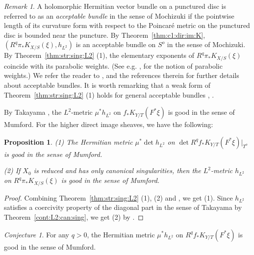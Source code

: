 \documentclass[amscd, leqno]{amsart}
\theoremstyle{plain}
\newtheorem{proposition}[theorem]{Proposition}
\theoremstyle{definition}
\theoremstyle{remark}
\newtheorem{remark}[theorem]{Remark}
\newtheorem{conjecture}[theorem]{Conjecture}
\newenvironment{pf}{\begin{proof}}{\end{proof}}
\begin{document}
\begin{remark}
A holomorphic Hermitian vector bundle on a punctured disc is referred to as an {\em acceptable bundle} in the sense of Mochizuki
\cite[Sect.\,21]{Mochizuki11} if the pointwise length of its curvature form with respect to the Poincar\'e metric on the punctured disc 
is bounded near the puncture. By Theorem~\ref{thm:c1:dir:im:K}, $(R^{q}\pi_{*}K_{X/S}(\xi),h_{L^{2}})$ is an acceptable bundle 
on $S^{o}$ in the sense of Mochizuki. By Theorem~\ref{thm:str:sing:L2} (1), the elementary exponents of $R^{q}\pi_{*}K_{X/S}(\xi)$
coincide with its parabolic weights. 
(See e.g. \cite[Sect.\,21.4.1]{Mochizuki11}, \cite[7.11]{FujinoFujisawaOno25} for the notion of parabolic weights.)
We refer the reader to \cite[Sect.\,21]{Mochizuki11}, \cite{FujinoFujisawaOno25} 
and the references therein for further details about acceptable bundles. 
It is worth remarking that a weak form of Theorem~\ref{thm:str:sing:L2} (1)
holds for general acceptable bundles \cite[Th.\,21.3.2]{Mochizuki11}, \cite[Th.\,1.13]{FujinoFujisawaOno25}.
\end{remark}


By Takayama \cite{Takayama22}, the $L^{2}$-metric $\mu^{*}h_{L^{2}}$ on $f_{*}K_{Y/T}(F^{*}\xi)$ is good in the sense of Mumford. 
For the higher direct image sheaves, we have the following:


\begin{proposition}
\label{prop:Mumf:good}
{\rm (1) }
The Hermitian metric $\mu^{*}\det h_{L^{2}}$ on $\det R^{q}f_{*}K_{Y/T}(F^{*}\xi)|_{T^{o}}$ is good in the sense of Mumford. 
\par{\rm (2) }
If $X_{0}$ is reduced and has only canonical singularities, then the $L^{2}$-metric $h_{L^{2}}$ on $R^{q}\pi_{*}K_{X/S}(\xi)$ 
is good in the sense of Mumford.
\end{proposition}

\begin{pf}
Combining Theorem~\ref{thm:str:sing:L2} (1), (2) and \cite[Prop.\,4.5]{Takayama22}, we get (1). 
Since $h_{L^{2}}$ satisfies a coercivity property of the diagonal part in the sense of Takayama \cite[Def.\,4.4]{Takayama22}
by Theorem~\ref{cont:L2:can:sing}, we get (2) by \cite[Prop.\,4.5]{Takayama22}.
\end{pf}


\begin{conjecture}
\label{conj:Mumford:goodness}
For any $q > 0$, the Hermitian metric $\mu^{*}h_{L^{2}}$ on $R^{q}f_{*}K_{Y/T}(F^{*}\xi)$ is good in the sense of Mumford.
\end{conjecture}
\end{document}
